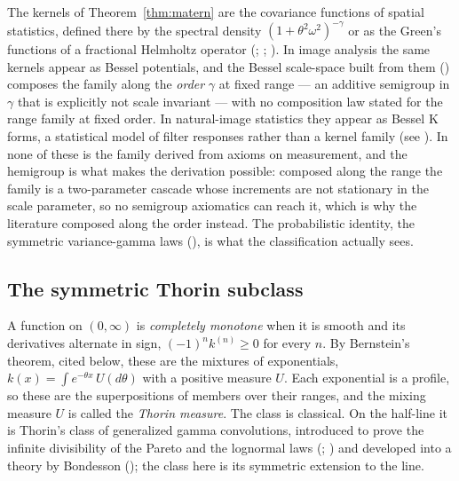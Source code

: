 \begin{remark}\label{rem:matern-literature}
The kernels of Theorem~\ref{thm:matern} are the \Matern{} covariance functions of spatial
statistics, defined there by the spectral density $(1+\theta^2\omega^2)^{-\gamma}$ or as the
Green's functions of a fractional Helmholtz operator (;
; ). In image analysis the same kernels
appear as Bessel potentials, and the Bessel scale-space built from them
() composes the family along the \emph{order} $\gamma$ at fixed
range --- an additive semigroup in $\gamma$ that is explicitly not scale invariant --- with no
composition law stated for the range family at fixed order. In natural-image statistics they
appear as Bessel K forms, a statistical model of filter responses rather than a kernel family
(see ). In none of these is the family derived from axioms on
measurement, and the hemigroup is what makes the derivation possible: composed along the range
the family is a two-parameter cascade whose increments are not stationary in the scale
parameter, so no semigroup axiomatics can reach it, which is why the literature composed along
the order instead. The probabilistic identity, the symmetric variance-gamma laws
(), is what the classification actually sees.
\end{remark}

\subsection{The symmetric Thorin subclass}\label{sec:thorin}

A function on $(0,\infty)$ is \emph{completely monotone} when it is smooth and its derivatives
alternate in sign, $(-1)^n k^{(n)} \ge 0$ for every $n$. By Bernstein's theorem, cited below,
these are the mixtures of exponentials, $k(x) = \int e^{-\theta x}\,U(d\theta)$ with a positive
measure $U$. Each exponential is a
\Matern{} profile, so these are the superpositions of \Matern{} members over their ranges, and
the mixing measure $U$ is called the \emph{Thorin measure}. The class is classical. On the
half-line it is Thorin's class of generalized gamma convolutions, introduced to prove the
infinite divisibility of the Pareto and the lognormal laws (;
) and developed into a theory by Bondesson
(); the class here is its symmetric extension to the line.

